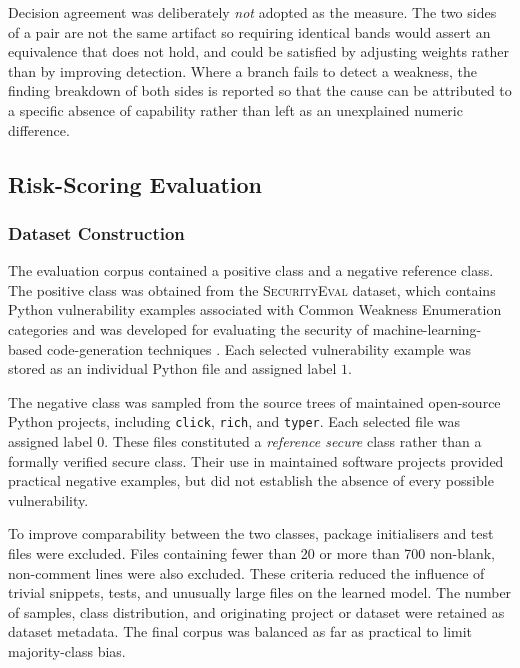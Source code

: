 Decision agreement was deliberately \emph{not} adopted as the measure. The two
sides of a pair are not the same artifact so requiring identical bands would assert
an equivalence that does not hold, and could be satisfied by adjusting weights
rather than by improving detection. Where a branch fails to detect a weakness,
the finding breakdown of both sides is reported so that the cause can be
attributed to a specific absence of capability rather than left as an
unexplained numeric difference.

\subsection{Risk-Scoring Evaluation}
\label{subsec:evaluation-rq3}

\subsubsection{Dataset Construction}
\label{subsubsec:evaluation-dataset}

The evaluation corpus contained a positive class and a negative reference class. The
positive class was obtained from the \textsc{SecurityEval} dataset, which contains
Python vulnerability examples associated with Common Weakness Enumeration categories
and was developed for evaluating the security of machine-learning-based code-generation
techniques \cite{Siddiq2022SecurityEval}. Each selected vulnerability example was stored
as an individual Python file and assigned label $1$.

The negative class was sampled from the source trees of maintained open-source Python
projects, including \texttt{click}, \texttt{rich}, and \texttt{typer}. Each selected
file was assigned label $0$. These files constituted a \emph{reference secure} class
rather than a formally verified secure class. Their use in maintained software projects
provided practical negative examples, but did not establish the absence of every
possible vulnerability.

To improve comparability between the two classes, package initialisers and test files
were excluded. Files containing fewer than 20 or more than 700 non-blank,
non-comment lines were also excluded. These criteria reduced the influence of trivial
snippets, tests, and unusually large files on the learned model. The number of samples,
class distribution, and originating project or dataset were retained as dataset
metadata. The final corpus was balanced as far as practical to limit majority-class
bias.

